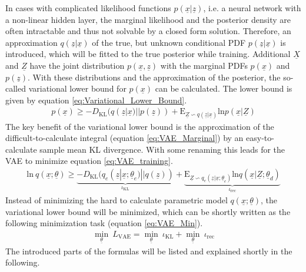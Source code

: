 \documentclass[12pt,DIV14,BCOR12mm,a4paper,footexclude,headinclude,halfparskip-,twoside,openright,cleardoubleempty,idxtotoc,bibtotoc,listtotoc,abstracton]{scrreprt} %
\numberwithin{equation}{chapter}
\begin{document}
In cases with complicated likelihood functions $p(\underline{x}|\underline{z})$, i.e. a neural network with a non-linear hidden layer, the marginal likelihood and the posterior density are often intractable and thus not solvable by a closed form solution. Therefore, an approximation $q(\underline{z}|\underline{x})$ of the true, but unknown conditional PDF $p(\underline{z}|\underline{x})$ is introduced, which will be fitted to the true posterior while training. Additional $\underline{X}$ and $\underline{Z}$ have the joint distribution $p(\underline{x},\underline{z})$ with the marginal PDFs $p(\underline{x})$ and $p(\underline{z})$. With these distributions and the approximation of the posterior, the so-called variational lower bound for $p(\underline{x})$ can be calculated. The lower bound is given by equation \ref{eq:Variational_Lower_Bound}.
\begin{align}
	 p(\underline{x}) \geq -D_{\textrm{KL}}(q(\underline{z}|\underline{x})||p(\underline{z}))+\textrm{E}_{\underline{Z}\backsim q(\underline{z}|\underline{x})}\textrm{ln}p(\underline{x}|\underline{Z})\label{eq:Variational_Lower_Bound}
\end{align}
The key benefit of the variational lower bound is the approximation of the difficult-to-calculate integral (equation \ref{eq:VAE_Marginal}) by an easy-to-calculate sample mean KL divergence. With some renaming this leads for the VAE to minimize equation \ref{eq:VAE_training}.
\begin{align}
	 \textrm{ln}\ q(\underline{x};\underline{\theta}) \geq \underbrace{-D_{\textrm{KL}}(q_e(\underline{z}|\underline{x};\underline{\theta}_e)||q(\underline{z}))}_{\iota_{\textrm{KL}}}+\underbrace{\textrm{E}_{\underline{Z}\backsim q_e(\underline{z}|\underline{x};\underline{\theta}_e)}\textrm{ln}q(\underline{x}|\underline{Z};\underline{\theta}_d)}_{\iota_{\textrm{rec}}}\label{eq:VAE_training}
\end{align}
Instead of minimizing the hard to calculate parametric model $q(\underline{x};\underline{\theta})$, the variational lower bound will be minimized, which can be shortly written as the following minimization task (equation \ref{eq:VAE_Min}).
\begin{align}
	\underset{\underline{\theta}}\min\ L_{\textrm{VAE}} = \underset{\underline{\theta}}\min\ \iota_{\textrm{KL}} + \underset{\underline{\theta}}\min\ \iota_{\textrm{rec}}\label{eq:VAE_Min}
\end{align}
The introduced parts of the formulas will be listed and explained shortly in the following.
\end{document}
